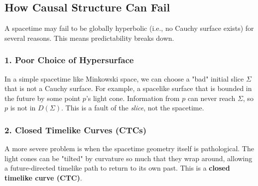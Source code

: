 \documentclass[11pt, a4paper]{report}
\begin{document}




\subsection*{How Causal Structure Can Fail}
A spacetime may fail to be globally hyperbolic (i.e., no Cauchy surface exists) for several reasons. This means predictability breaks down.

\subsubsection*{1. Poor Choice of Hypersurface}
In a simple spacetime like Minkowski space, we can choose a "bad" initial slice $\Sigma$ that is not a Cauchy surface. For example, a spacelike surface that is bounded in the future by some point $p$'s light cone. Information from $p$ can never reach $\Sigma$, so $p$ is not in $D(\Sigma)$. This is a fault of the \emph{slice}, not the spacetime.








\subsubsection*{2. Closed Timelike Curves (CTCs)}
A more severe problem is when the spacetime geometry itself is pathological. The light cones can be "tilted" by curvature so much that they wrap around, allowing a future-directed timelike path to return to its own past. This is a \textbf{closed timelike curve (CTC)}.



\end{document}
